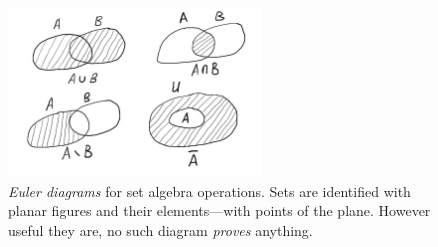 \documentclass[12pt,notitlepage]{article}
\theoremstyle{plain}
\theoremstyle{definition}
\theoremstyle{plain}
\newcommand{\1}{\mathbf{1}}
\newcommand{\0}{\mathbf{0}}
\begin{document}
\begin{figure}[h]
\centering
\includegraphics*[width=0.6\textwidth]{set_algebra.pdf}
\caption{\emph{Euler diagrams} for set algebra operations. Sets are identified with planar figures and their elements---with points of the plane. However useful they are, no such diagram \emph{proves} anything.}
\end{figure}
\end{document}
